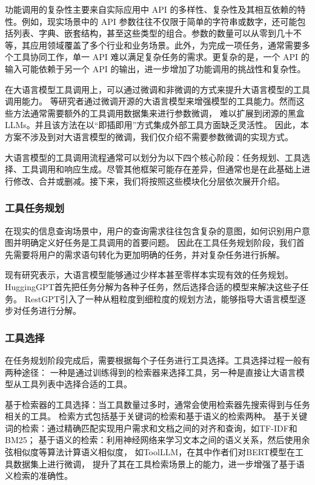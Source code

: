 功能调用的复杂性主要来自实际应用中 API 的多样性、复杂性及其相互依赖的特性\cite{Qin2023}。例如，现实场景中的 API 参数往往不仅限于简单的字符串或数字，还可能包括列表、字典、嵌套结构，甚至这些类型的组合。参数的数量可以从零到几十不等，其应用领域覆盖了多个行业和业务场景\cite{ye2024tooleyes}。此外，为完成一项任务，通常需要多个工具协同工作，单一 API 难以满足复杂任务的需求\cite{huang2024planning}。更复杂的是，一个 API 的输入可能依赖于另一个 API 的输出\cite{Qin2023}，进一步增加了功能调用的挑战性和复杂性。

在大语言模型工具调用上，可以通过微调和非微调的方式来提升大语言模型的工具调用能力。
\cite{Qin2023, schick2024toolformer, hao2024toolkengpt, parisi2022talm}等研究者通过微调开源的大语言模型来增强模型的工具能力。然而这些方法通常需要额外的工具调用数据集来进行参数微调，
难以扩展到闭源的黑盒LLMs。并且该方法在以“即插即用”方式集成外部工具方面缺乏灵活性。
因此，本方案不涉及到对大语言模型的微调，我们仅介绍不需要参数微调的实现方式。

大语言模型的工具调用流程通常可以划分为以下四个核心阶段\cite{Ruan2023, Shen2023, Song2023}：任务规划、工具选择、工具调用和响应生成。尽管其他框架可能存在差异，但通常也是在此基础上进行修改、合并或删减。接下来，我们将按照这些模块化分层依次展开介绍。

\subsubsection{工具任务规划}

在现实的信息查询场景中，用户的查询需求往往包含复杂的意图，如何识别用户意图并明确定义好任务是工具调用的首要问题。
因此在工具任务规划阶段，我们首先需要将用户的需求语句转化为更加明确的任务，并对复杂任务进行拆解。

现有研究\cite{Miao2023}表示，大语言模型能够通过少样本甚至零样本实现有效的任务规划。
HuggingGPT\cite{Shen2023}首先把任务分解为各种子任务，然后选择合适的模型来解决这些子任务。
RestGPT\cite{Song2023}引入了一种从粗粒度到细粒度的规划方法，能够指导大语言模型逐步对任务进行分解。

\subsubsection{工具选择}

在任务规划阶段完成后，需要根据每个子任务进行工具选择。工具选择过程一般有两种途径：
一种是通过训练得到的检索器来选择工具，另一种是直接让大语言模型从工具列表中选择合适的工具。

基于检索器的工具选择：当工具数量过多时，通常会使用检索器先搜索得到与任务相关的工具。
检索方式包括基于关键词的检索和基于语义的检索两种。
基于关键词的检索：通过精确匹配实现用户需求和文档之间的对齐和查询，如TF-IDF\cite{Jones1972}和BM25\cite{Robertson2009}；
基于语义的检索：利用神经网络来学习文本之间的语义关系，然后使用余弦相似度等算法计算语义相似度，
如ToolLLM\cite{Qin2023}，在其中作者们对BERT模型在工具数据集上进行微调，
提升了其在工具检索场景上的能力，进一步增强了基于语义检索的准确性。

